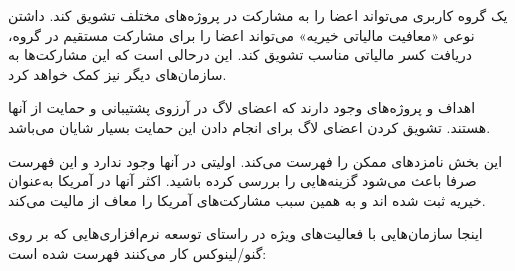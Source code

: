 یک گروه کاربری می‌تواند اعضا را به مشارکت در پروژه‌های مختلف تشویق کند.
داشتن نوعی «معافیت مالیاتی خیریه» می‌تواند اعضا را برای مشارکت مستقیم در گروه،
دریافت کسر مالیاتی مناسب تشویق کند. این درحالی است که این مشارکت‌ها
به سازمان‌های دیگر نیز کمک خواهد کرد.

اهداف و پروژه‌های وجود دارند که اعضای لاگ در آرزوی پشتیبانی و حمایت از آنها هستند.
تشویق کردن اعضای لاگ برای انجام دادن این حمایت بسیار شایان می‌باشد.

این بخش نامزد‌های ممکن را فهرست می‌کند. اولیتی در آنها وجود ندارد و این فهرست
صرفا باعث می‌شود گزینه‌هایی را بررسی کرده باشید. اکثر آنها در آمریکا به‌عنوان
خیریه ثبت شده اند و به همین سبب مشارکت‌های آمریکا را معاف از مالیت می‌کند.

اینجا سازمان‌هایی با فعالیت‌های ویژه در راستای توسعه نرم‌افزاری‌هایی که
بر روی گنو/لینوکس کار می‌کنند فهرست شده است:

